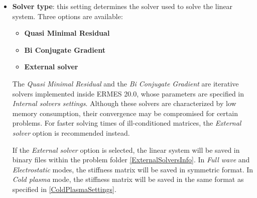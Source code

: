 \begin{itemize}\itemsep0.5em 
	\item \textbf{Solver type}: this setting determines the solver used to solve the linear system. Three options are available:
	\begin{itemize}\itemsep0.25em 
	    \item \textbf{Quasi Minimal Residual}
	    \item \textbf{Bi Conjugate Gradient}
	    \item \textbf{External solver}
    \end{itemize}
    The \textit{Quasi Minimal Residual} and the \emph{Bi Conjugate Gradient} are iterative solvers implemented inside ERMES 20.0, whose parameters are specified in \emph{Internal solvers settings}. Although these solvers are characterized by low memory consumption, their convergence may be compromised for certain problems. For faster solving times of ill-conditioned matrices, the \emph{External solver} option is recommended instead. 
    
    If the \emph{External solver} option is selected, the linear system will be saved in binary files within the problem folder \ref{ExternalSolversInfo}. In \textit{Full wave} and \textit{Electrostatic} modes, the stiffness matrix will be saved in symmetric format. In \textit{Cold plasma} mode, the stiffness matrix will be saved in the same format as specified in \ref{ColdPlasmaSettings}. 
    

\end{itemize}
